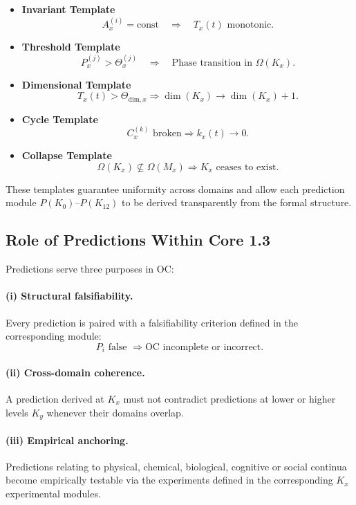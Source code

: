 \begin{itemize}
    \item \textbf{Invariant Template}
    \[
    A_x^{(i)} = \mathrm{const}
    \quad\Rightarrow\quad
    T_x(t) \text{ monotonic}.
    \]

    \item \textbf{Threshold Template}
    \[
    P_x^{(j)} > \Theta_x^{(j)}
    \quad\Rightarrow\quad
    \text{Phase transition in }\Omega(K_x).
    \]

    \item \textbf{Dimensional Template}
    \[
    T_x(t) > \Theta_{\mathrm{dim},x}
    \Rightarrow
    \dim(K_x)\to\dim(K_x)+1.
    \]

    \item \textbf{Cycle Template}
    \[
    C_x^{(k)} \text{ broken}
    \Rightarrow
    k_x(t)\to 0.
    \]

    \item \textbf{Collapse Template}
    \[
    \Omega(K_x)\not\subseteq\Omega(M_x)
    \Rightarrow
    K_x\text{ ceases to exist}.
    \]
\end{itemize}

These templates guarantee uniformity across domains  
and allow each prediction module $P(K_0)$–$P(K_{12})$  
to be derived transparently from the formal structure.

\subsection{Role of Predictions Within Core 1.3}

Predictions serve three purposes in OC:

\paragraph{(i) Structural falsifiability.}
Every prediction is paired with a falsifiability criterion  
defined in the corresponding module:
\[
P_i \text{ false } \Rightarrow \text{OC incomplete or incorrect}.
\]

\paragraph{(ii) Cross-domain coherence.}
A prediction derived at $K_x$ must not contradict predictions at  
lower or higher levels $K_y$ whenever their domains overlap.

\paragraph{(iii) Empirical anchoring.}
Predictions relating to physical, chemical, biological, cognitive or  
social continua become empirically testable via the experiments  
defined in the corresponding $K_x$ experimental modules.

